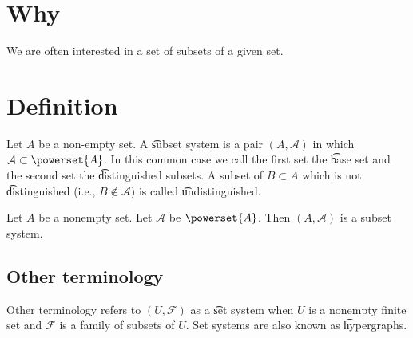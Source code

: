 
\section*{Why}

We are often interested in a set of subsets of a given set.

\section*{Definition}

Let $A$ be a non-empty set.
A \t{subset system} is a pair $(A, \mathcal{A} )$ in which $\mathcal{A}  \subset \powerset{A}$.
In this common case we call the first set the \t{base set} and the second set the \t{distinguished subsets}.
A subset of $B \subset A$ which is not \t{distinguished} (i.e., $B \not\in \mathcal{A} $) is called \t{undistinguished}.

\begin{example}
Let $A$ be a nonempty set.
Let $\mathcal{A} $ be $\powerset{A}$.
Then $(A, \mathcal{A} )$ is a subset system.
\end{example}

\subsection*{Other terminology}

Other terminology refers to $(U, \mathcal{F} )$ as a \t{set system} when $U$ is a nonempty finite set and $\mathcal{F} $ is a family of subsets of $U$.
Set systems are also known as \t{hypergraphs}.


\blankpage